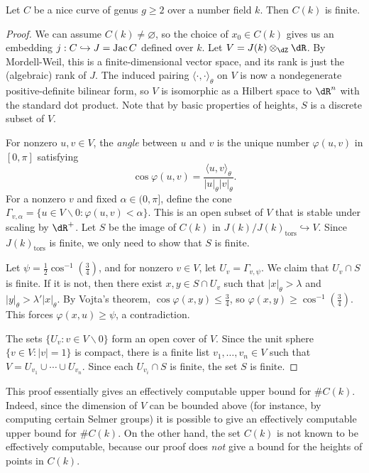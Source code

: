 \begin{theorem}[Faltings]
Let $C$ be a nice curve of genus $g\geqslant 2$ over a number field $k$. Then 
$C(k)$ is finite.
\end{theorem}
\begin{proof}
We can assume $C(k)\ne\varnothing$, so the choice of $x_0\in C(k)$ gives us an 
embedding $j:C\hookrightarrow J=\operatorname{Jac} C$ defined over $k$. Let 
$V=J(k)\otimes_\dZ\dR$. By Mordell-Weil, this is a finite-dimensional 
vector space, and its rank is just the (algebraic) rank of $J$. The induced 
pairing $\langle\cdot,\cdot\rangle_\theta$ on $V$ is now a nondegenerate 
positive-definite bilinear form, so $V$ is isomorphic as a Hilbert space to 
$\dR^n$ with the standard dot product. Note that by basic properties of 
heights, $S$ is a discrete subset of $V$. 

For nonzero $u,v\in V$, the \emph{angle} between $u$ and $v$ is the unique 
number $\varphi(u,v)$ in $[0,\pi]$ satisfying 
\[
  \cos\varphi(u,v) = \frac{\langle u,v\rangle_\theta}{|u|_\theta |v|_\theta} \text{.}
\]
For a nonzero $v$ and fixed $\alpha\in (0,\pi]$, define the cone 
$\Gamma_{v,\alpha} = \{u\in V\smallsetminus 0 : \varphi(u,v)<\alpha\}$. This is an open 
subset of $V$ that is stable under scaling by $\dR^+$. Let $S$ be the image of 
$C(k)$ in $J(k)/J(k)_\text{tors}\hookrightarrow V$. Since $J(k)_\text{tors}$ is 
finite, we only need to show that $S$ is finite. 

Let $\psi = \frac 1 2 \cos^{-1}(\frac 3 4)$, and for nonzero $v\in V$, let 
$U_v=\Gamma_{v,\psi}$. We claim that $U_v\cap S$ is finite. If it is not, 
then there exist $x,y\in S\cap U_v$  such that $|x|_\theta>\lambda$ and 
$|y|_\theta>\lambda'|x|_\theta$. By Vojta's theorem, 
$\cos\varphi(x,y)\leqslant \frac 3 4$, so 
$\varphi(x,y)\geqslant \cos^{-1}(\frac 3 4)$. This forces 
$\varphi(x,u)\geqslant \psi$, a contradiction. 

The sets $\{U_v:v\in V\smallsetminus 0\}$ form an open cover of $V$. Since the unit 
sphere $\{v\in V:|v|=1\}$ is compact, there is a finite list 
$v_1,\dots,v_n\in V$ such that $V=U_{v_1}\cup \cdots \cup U_{v_n}$. Since each 
$U_{v_i}\cap S$ is finite, the set $S$ is finite. 
\end{proof}

This proof essentially gives an effectively computable upper bound for 
$\# C(k)$. Indeed, since the dimension of $V$ can be bounded above (for 
instance, by computing certain Selmer groups) it is possible to give an 
effectively computable upper bound for $\# C(k)$. On the other hand, the set 
$C(k)$ is not known to be effectively computable, because our proof does 
\emph{not} give a bound for the heights of points in $C(k)$.




